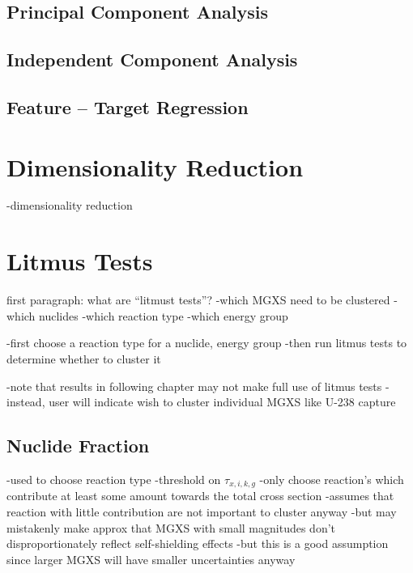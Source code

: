 \subsection{Principal Component Analysis}
\label{subsec:chap10-feature-transform-pca}

\subsection{Independent Component Analysis}
\label{subsec:chap10-feature-transform-ica}

\subsection{Feature -- Target Regression}
\label{subsec:chap10-feature-transform-regression}


\section{Dimensionality Reduction}
\label{sec:chap10-dimensions-reduce}

-dimensionality reduction

\section{Litmus Tests}
\label{sec:chap10-litmus}

first paragraph: what are ``litmust tests''?
-which \ac{MGXS} need to be clustered
  -which nuclides
  -which reaction type
  -which energy group

-first choose a reaction type for a nuclide, energy group
-then run litmus tests to determine whether to cluster it

-note that results in following chapter may not make full use of litmus tests
  -instead, user will indicate wish to cluster individual MGXS like U-238 capture

\subsection{Nuclide Fraction}
\label{subsec:chap10-litmus-nuc-frac}

-used to choose reaction type
-threshold on $\tau_{x,i,k,g}$
-only choose reaction's which contribute at least some amount towards the total cross section
  -assumes that reaction with little contribution are not important to cluster anyway
  -but may mistakenly make approx that MGXS with small magnitudes don't disproportionately reflect self-shielding effects
    -but this is a good assumption since larger MGXS will have smaller uncertainties anyway

